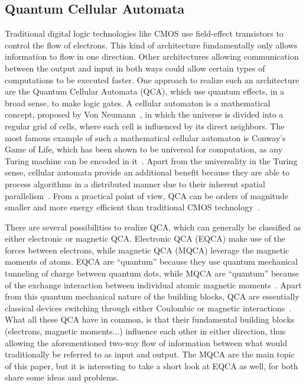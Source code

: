 \documentclass[11pt,a4paper,english,twoside]{article}
\begin{document}
\subsection{Quantum Cellular Automata}
Traditional digital logic technologies like CMOS use field-effect transistors to control the flow of electrons. This kind of architecture fundamentally only allows information to flow in one direction. Other architectures allowing communication between the output and input in both ways could allow certain types of computations to be executed faster. One approach to realize such an architecture are the Quantum Cellular Automata (QCA), which use quantum effects, in a broad sense, to make logic gates. A cellular automaton is a mathematical concept, proposed by Von Neumann~\cite{Sideinfo_SelfRepAutomata}, in which the universe is divided into a regular grid of cells, where each cell is influenced by its direct neighbors. The most famous example of such a mathematical cellular automaton is Conway's Game of Life, which has been shown to be universal for computation, as any Turing machine can be encoded in it~\cite{QCA_GameOfLife}. Apart from the universality in the Turing sense, cellular automata provide an additional benefit because they are able to process algorithms in a distributed manner due to their inherent spatial parallelism~\cite{QCA_GameOfLife}. From a practical point of view, QCA can be orders of magnitude smaller and more energy efficient than traditional CMOS technology~\cite{MQCA_RoomTemp}. \par
There are several possibilities to realize QCA, which can generally be classified as either electronic or magnetic QCA. Electronic QCA (EQCA) make use of the forces between electrons, while magnetic QCA (MQCA) leverage the magnetic moments of atoms. EQCA are ``quantum'' because they use quantum mechanical tunneling of charge between quantum dots, while MQCA are ``quantum'' because of the exchange interaction between individual atomic magnetic moments~\cite{MQCA_RoomTemp}. Apart from this quantum mechanical nature of the building blocks, QCA are essentially classical devices switching through either Coulombic or magnetic interactions~\cite{QCA_Algorithms}. What all these QCA have in common, is that their fundamental building blocks (electrons, magnetic moments...) influence each other in either direction, thus allowing the aforementioned two-way flow of information between what would traditionally be referred to as input and output. The MQCA are the main topic of this paper, but it is interesting to take a short look at EQCA as well, for both share some ideas and problems. \par
\end{document}
